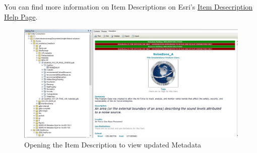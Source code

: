 \documentclass[openany]{book}
\theoremstyle{definition}
\theoremstyle{definition}
\theoremstyle{definition}
\theoremstyle{remark}
\begin{document}
You can find more information on Item Descriptions on Esri's
\href{http://desktop.arcgis.com/en/arcmap/latest/map/working-with-arcmap/documenting-items-in-the-catalog-window.htm}{Item
Desecription Help Page}.

\begin{figure}[H]

{\centering \includegraphics[width=7.86in,]{figures/imMetaArc-after} 

}

\caption{Opening the Item Description to view updated Metadata}\label{fig:imMetaArcafter}
\end{figure}


\end{document}
